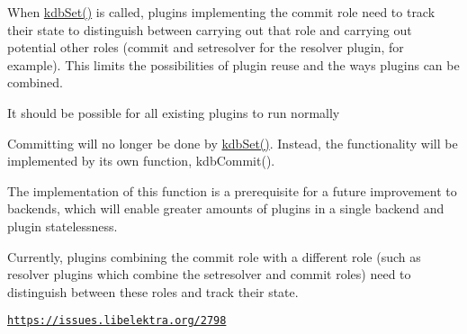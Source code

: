 When {\ttfamily \hyperlink{group__kdb_ga11436b058408f83d303ca5e996832bcf}{kdb\+Set()}} is called, plugins implementing the commit role need to track their state to distinguish between carrying out that role and carrying out potential other roles (commit and setresolver for the resolver plugin, for example). This limits the possibilities of plugin reuse and the ways plugins can be combined.


\begin{DoxyItemize}
\item It should be possible for all existing plugins to run normally
\end{DoxyItemize}

Committing will no longer be done by {\ttfamily \hyperlink{group__kdb_ga11436b058408f83d303ca5e996832bcf}{kdb\+Set()}}. Instead, the functionality will be implemented by its own function, {\ttfamily kdb\+Commit()}.

The implementation of this function is a prerequisite for a future improvement to backends, which will enable greater amounts of plugins in a single backend and plugin statelessness.

Currently, plugins combining the {\ttfamily commit} role with a different role (such as resolver plugins which combine the {\ttfamily setresolver} and {\ttfamily commit} roles) need to distinguish between these roles and track their state.

\href{https://issues.libelektra.org/2798}{\tt https\+://issues.\+libelektra.\+org/2798} 